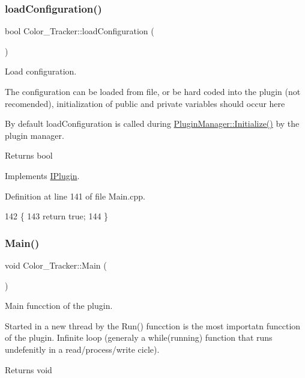 \subsubsection{\texorpdfstring{load\+Configuration()}{loadConfiguration()}}
{\footnotesize\ttfamily bool Color\+\_\+\+Tracker\+::load\+Configuration (\begin{DoxyParamCaption}{ }\end{DoxyParamCaption})\hspace{0.3cm}{\ttfamily [virtual]}}



Load configuration. 

The configuration can be loaded from file, or be hard coded into the plugin (not recomended), initialization of public and private variables should occur here

By default load\+Configuration is called during \hyperlink{class_plugin_manager_a956e653b7db36da9d034b4a93c8308d5}{Plugin\+Manager\+::\+Initialize()} by the plugin manager.

\begin{DoxyReturn}{Returns}
bool 
\end{DoxyReturn}


Implements \hyperlink{class_i_plugin_a418cff309436d3a15d9a4ce7369db6dd}{I\+Plugin}.



Definition at line 141 of file Main.\+cpp.


\begin{DoxyCode}
142 \{
143     \textcolor{keywordflow}{return} \textcolor{keyword}{true};
144 \}
\end{DoxyCode}
\mbox{\label{class_color___tracker_a6d533ef7ecaea3ea1b2ae149f9336cec}} 
\subsubsection{\texorpdfstring{Main()}{Main()}}
{\footnotesize\ttfamily void Color\+\_\+\+Tracker\+::\+Main (\begin{DoxyParamCaption}{ }\end{DoxyParamCaption})\hspace{0.3cm}{\ttfamily [virtual]}}



Main funcction of the plugin. 

Started in a new thread by the Run() funcction is the most importatn funcction of the plugin. Infinite loop (generaly a while(running) function that runs undefenitly in a read/process/write cicle). \begin{DoxyReturn}{Returns}
void 
\end{DoxyReturn}


